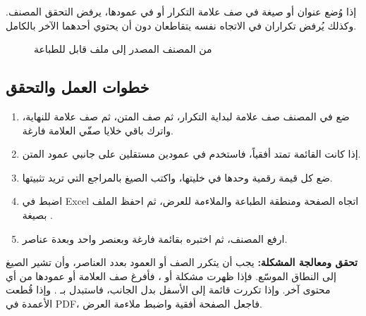 \begin{rcwarn}
إذا وُضع عنوان أو صيغة في صف علامة التكرار أو في عمودها، يرفض التحقق المصنف. وكذلك يُرفض تكراران في الاتجاه نفسه يتقاطعان دون أن يحتوي أحدهما الآخر بالكامل.
\end{rcwarn}

\begin{figure}[H]
\centering
{}
\rclegend
\caption{من المصنف المصدر إلى ملف قابل للطباعة}
\label{fig:builder-xlsx-tags-flow}
\end{figure}

\subsection{خطوات العمل والتحقق}
\begin{enumerate}
\item ضع في المصنف صف علامة لبداية التكرار، ثم صف المتن، ثم صف علامة للنهاية، واترك باقي خلايا صفّي العلامة فارغة.
\item إذا كانت القائمة تمتد أفقياً، فاستخدم  في عمودين مستقلين على جانبي عمود المتن.
\item ضع كل قيمة رقمية وحدها في خليتها، واكتب الصيغ بالمراجع التي تريد تثبيتها.
\item اضبط في Excel اتجاه الصفحة ومنطقة الطباعة والملاءمة للعرض، ثم احفظ الملف بصيغة .
\item ارفع المصنف، ثم اختبره بقائمة فارغة وبعنصر واحد وبعدة عناصر.
\end{enumerate}

\textbf{تحقق ومعالجة المشكلة:} يجب أن يتكرر الصف أو العمود بعدد العناصر، وأن تشير الصيغ إلى النطاق الموسّع. فإذا ظهرت مشكلة  أو ، فأفرغ صف العلامة أو عمودها من أي محتوى آخر. وإذا تكررت قائمة إلى الأسفل بدل الجانب، فاستبدل  بـ . وإذا قُطعت الأعمدة في PDF، فاجعل الصفحة أفقية واضبط ملاءمة العرض.

